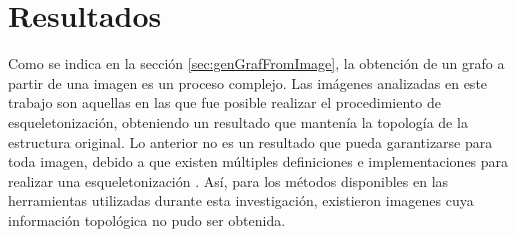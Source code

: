 \chapter{Resultados}
\label{chap:res}

Como se indica en la secci\'on \ref{sec:genGrafFromImage}, la obtenci\'on de un grafo a partir de una imagen es un proceso complejo. Las im\'agenes analizadas en este trabajo son aquellas en las que fue posible realizar el procedimiento de esqueletonizaci\'on, obteniendo un resultado que manten\'ia la topolog\'ia de la estructura original. Lo anterior no es un resultado que pueda garantizarse para toda imagen, debido a que existen m\'ultiples definiciones e implementaciones para realizar una esqueletonizaci\'on . As\'i, para los m\'etodos disponibles en las herramientas utilizadas durante esta investigaci\'on, existieron imagenes cuya informaci\'on topol\'ogica no pudo ser obtenida.







